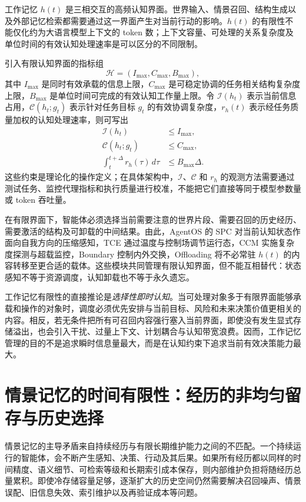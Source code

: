 工作记忆 $h(t)$ 是三相交互的高频认知界面。世界输入、情景召回、结构生成以及外部记忆检索都需要通过这一界面产生对当前行动的影响。$h(t)$ 的有限性不能仅化约为大语言模型上下文的 token 数；上下文容量、可处理的关系复杂度及单位时间的有效认知处理速率是可以区分的不同限制。

引入有限认知界面的指标组
\begin{equation}
  \mathcal{H}=(I_{\max},C_{\max},B_{\max}),
\end{equation}
其中 $I_{\max}$ 是同时有效承载的信息上限，$C_{\max}$ 是可稳定协调的任务相关结构复杂度上限，$B_{\max}$ 是单位时间可完成的有效认知工作量上限。令 $\mathcal I(h_t)$ 表示当前信息占用，$\mathcal C(h_t;g_t)$ 表示针对任务目标 $g_t$ 的有效协调复杂度，$r_h(t)$ 表示经任务质量加权的认知处理速率，则可写出
\begin{align}
 \mathcal I(h_t)&\le I_{\max},\label{eq:h-info}\\
 \mathcal C(h_t;g_t)&\le C_{\max},\label{eq:h-complexity}\\
 \int_{t}^{t+\Delta}r_h(\tau)\,d\tau&\le B_{\max}\Delta.\label{eq:h-bandwidth}
\end{align}
这些约束是理论化的操作定义；在具体架构中，$\mathcal I$、$\mathcal C$ 和 $r_h$ 的观测方法需要通过测试任务、监控代理指标和执行质量进行校准，不能把它们直接等同于模型参数量或 token 吞吐量。

在有限界面下，智能体必须选择当前需要注意的世界片段、需要召回的历史经历、需要激活的结构及可卸载的中间结果。由此，AgentOS 的 SPC 对当前认知状态作面向自我方向的压缩感知，TCE 通过温度与控制场调节运行态，CCM 实施复杂度探测与超载监控，Boundary 控制内外交换，Offloading 将不必常驻 $h(t)$ 的内容转移至更合适的载体。这些模块共同管理有限认知界面，但不能互相替代：状态感知不等于资源调度，认知卸载也不等于永久遗忘。

工作记忆有限性的直接推论是\emph{选择性即时认知}。当可处理对象多于有限界面能够承载和操作的对象时，调度必须优先安排与当前目标、风险和未来决策价值更相关的内容。相反，若无条件把所有可召回内容强行塞入当前界面，即使没有发生显式存储溢出，也会引入干扰、过量上下文、计划耦合与认知带宽浪费。因而，工作记忆管理的目的不是追求瞬时信息量最大，而是在认知约束下追求当前有效决策能力最大。

\section{情景记忆的时间有限性：经历的非均匀留存与历史选择}
\label{sec:e-finitude}

情景记忆的主导矛盾来自持续经历与有限长期维护能力之间的不匹配。一个持续运行的智能体，会不断产生感知、决策、行动及其后果。如果所有经历都以同样的时间精度、语义细节、可检索等级和长期索引成本保存，则内部维护负担将随经历总量累积。即使冷存储容量足够，逐渐扩大的历史空间仍然需要解决召回噪声、情景误配、旧信息失效、索引维护以及再验证成本等问题。

